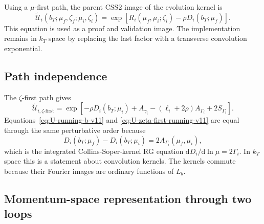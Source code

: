 \documentclass[11pt]{article}
\newcommand{\dd}{\mathrm{d}}
\begin{document}
Using a $\mu$-first path, the parent CSS2 image of the evolution kernel is
\begin{equation}
  \boxed{
  \widetilde{\mathcal U}_i(b_T;\mu_f,\zeta_f;\mu_i,\zeta_i)
  =\exp\!\left[
      R_i(\mu_f,\mu_i;\zeta_i)-\rho D_i(b_T;\mu_f)
    \right].}
  \label{eq:U-running-b-v11}
\end{equation}
This equation is used as a proof and validation image.  The implementation remains in
$k_T$ space by replacing the last factor with a transverse convolution exponential.

\subsection{Path independence}

The $\zeta$-first path gives
\begin{equation}
  \widetilde{\mathcal U}_{i,\zeta\text{-first}}
  =\exp\!\left[
      -\rho D_i(b_T;\mu_i)
      +A_{\gamma_i}-(\ell_i+2\rho)A_{\Gamma_i}+2S_{\Gamma_i}
    \right].
  \label{eq:U-zeta-first-running-v11}
\end{equation}
Equations~\eqref{eq:U-running-b-v11} and \eqref{eq:U-zeta-first-running-v11} are equal
through the same perturbative order because
\begin{equation}
  D_i(b_T;\mu_f)-D_i(b_T;\mu_i)=2A_{\Gamma_i}(\mu_f,\mu_i),
  \label{eq:D-difference-A-v11}
\end{equation}
which is the integrated Collins-Soper-kernel RG equation
$\dd D_i/\dd\ln\mu=2\Gamma_i$.  In $k_T$ space this is a statement about convolution
kernels.  The kernels commute because their Fourier images are ordinary functions of
$L_b$.

\subsection{Momentum-space representation through two loops}
\end{document}
